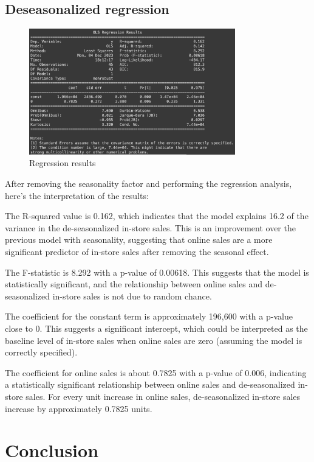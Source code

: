 \documentclass{article}
\begin{document}
\subsection{Deseasonalized regression}

\begin{figure}[h]
  \centering
  \includegraphics[width=0.8\textwidth]{Deseasonalized regression.png}
  \caption{Regression results}
  \label{fig:yourlabel}
\end{figure}

After removing the seasonality factor and performing the regression analysis, here's the interpretation of the results:

The R-squared value is 0.162, which indicates that the model explains 16.2 of the variance in the de-seasonalized in-store sales. This is an improvement over the previous model with seasonality, suggesting that online sales are a more significant predictor of in-store sales after removing the seasonal effect.

The F-statistic is 8.292 with a p-value of 0.00618. This suggests that the model is statistically significant, and the relationship between online sales and de-seasonalized in-store sales is not due to random chance.

The coefficient for the constant term is approximately 196,600 with a p-value close to 0. This suggests a significant intercept, which could be interpreted as the baseline level of in-store sales when online sales are zero (assuming the model is correctly specified).

The coefficient for online sales is about 0.7825 with a p-value of 0.006, indicating a statistically significant relationship between online sales and de-seasonalized in-store sales. For every unit increase in online sales, de-seasonalized in-store sales increase by approximately 0.7825 units.

\section{Conclusion}
\end{document}

